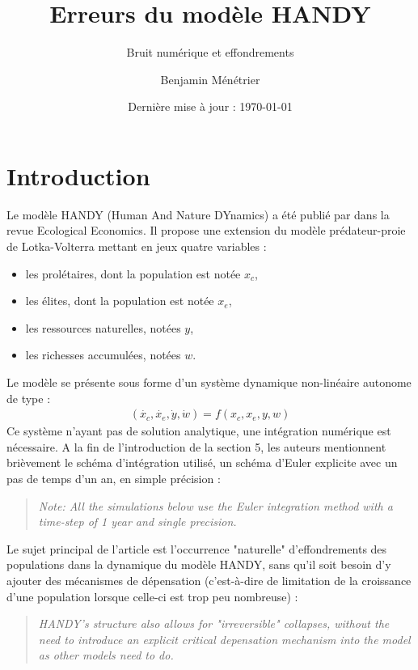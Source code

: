 \documentclass[12pt]{scrartcl}
\begin{document}
\title{\vspace{-1.2cm}Erreurs du modèle HANDY}
\subtitle{Bruit numérique et effondrements}
\author{Benjamin Ménétrier}
\date{Dernière mise à jour : \today\vspace{-0.5cm}}

\thispagestyle{empty}

\maketitle

\section{Introduction}
Le modèle HANDY (Human And Nature DYnamics) a été publié par \citet{motesharrei_2014} dans la revue Ecological Economics. Il propose une extension du modèle prédateur-proie de Lotka-Volterra mettant en jeux quatre variables : 
\begin{itemize}
\item les prolétaires, dont la population est notée $x_c$,
\item les élites, dont la population est notée $x_e$,
\item les ressources naturelles, notées $y$,
\item les richesses accumulées, notées $w$.
\end{itemize}
Le modèle se présente sous forme d'un système dynamique non-linéaire autonome de type : 
\begin{align}
\left(\dot{x_c},\dot{x_e},\dot{y},\dot{w}\right) = f\left(x_c,x_e,y,w\right)
\end{align}
Ce système n'ayant pas de solution analytique, une intégration numérique est nécessaire. A la fin de l'introduction de la section 5, les auteurs mentionnent brièvement le schéma d'intégration utilisé, un schéma d'Euler explicite avec un pas de temps d'un an, en simple précision :
\begin{quote}
\textit{Note: All the simulations below use the Euler integration method with a time-step of 1 year and single precision.}
\end{quote}
Le sujet principal de l'article est l’occurrence "naturelle" d'effondrements des populations dans la dynamique du modèle HANDY, sans qu'il soit besoin d'y ajouter 
des mécanismes de dépensation (c'est-à-dire de limitation de la croissance d'une population lorsque celle-ci est trop peu nombreuse) :
\begin{quote}
\textit{HANDY's structure also allows for "irreversible" collapses, without the need to introduce an explicit critical depensation mechanism into the model as other models need to do.}
\end{quote}
\end{document}
